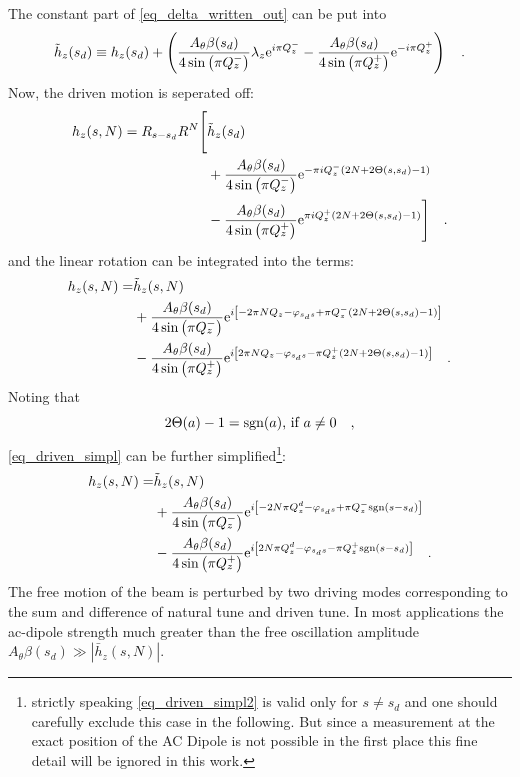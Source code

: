 %
The constant part of \eqref{eq_delta_written_out} can be put into 
%
\begin{equation}
    \tilde{h}_z(s_d) \equiv h_z(s_d) + 
    \left(
    \frac{A_\theta\beta(s_d)}{4\sin\left( \pi Q_z^-\right)}\lambda_z \text{e}^{i \pi Q_z^-}
    -\frac{A_\theta\beta(s_d)}{4\sin\left( \pi Q_z^+\right)} \text{e}^{-i\pi Q_z^+}
    \right)
    \quad .
\end{equation}
%
Now, the driven motion is seperated off:
%
\begin{align}
    h_z(s, N) = R_{s-s_d}R^N 
    \Bigg[&\tilde{h}_z(s_d) 
    \notag \\
        &+ \frac{A_\theta\beta(s_d)}{4\sin\left( \pi Q_z^-\right)} \text{e}^{-\pi i Q_z^-(2N+2\Theta(s,s_d)-1)} 
         \notag \\
        &- \frac{A_\theta\beta(s_d)}{4\sin\left( \pi Q_z^+\right)} \text{e}^{\pi i Q_z^+(2N+2\Theta(s,s_d) -1)}
    \Bigg]
    \quad .
    \label{eq_driven_simpl}
\end{align}
%
and the linear rotation can be integrated into the terms:
%
\begin{align}
    h_z(s, N) =
        &\tilde{h}_z(s, N) \notag \\
        &+\frac{A_\theta\beta(s_d)}{4\sin\left( \pi Q_z^-\right)}
        \text{e}^{i\left[-2\pi NQ_{z} - \varphi_{s_ds} + \pi Q_z^-(2N+2\Theta(s,s_d)-1)\right]}
        \notag\\
        &-\frac{A_\theta\beta(s_d)}{4\sin\left( \pi Q_z^+\right)}
        \text{e}^{i\left[2\pi NQ_{z} - \varphi_{s_ds}- \pi Q_z^+(2N + 2\Theta(s,s_d) -1)\right]}
    \quad .
    \label{eq_driven_simpl}
\end{align}
%
Noting that
%
\begin{equation}
  2\Theta(a) - 1 = \text{sgn}(a) \text{, if } a \neq 0
    \quad ,
\end{equation}
%
\eqref{eq_driven_simpl} can be further simplified\footnote{
    strictly speaking \eqref{eq_driven_simpl2} is valid only for $s\neq s_d$ and one should carefully exclude this case
    in the following. But since a measurement at the exact position of the AC Dipole is not possible in the first place
    this fine detail will be ignored in this work.
    }:
%
\begin{align}
    h_z(s, N) =
        &\tilde{h}_z(s, N) \notag \\
        &+ \frac{A_\theta\beta(s_d)}{4\sin\left( \pi Q_z^-\right)}
        \text{e}^{i\left[-2N\pi Q^{d}_{z} - \varphi_{s_ds} + \pi Q_z^-\text{sgn}(s-s_d)\right]} 
        \notag \\
        &- \frac{A_\theta\beta(s_d)}{4\sin\left( \pi Q_z^+\right)}
        \text{e}^{i\left[2N\pi Q^{d}_{z} - \varphi_{s_ds} - \pi Q_z^+\text{sgn}(s-s_d)\right]} 
    \quad .
    \label{eq_driven_simpl2}
\end{align}
%
The free motion of the beam is perturbed by two driving modes corresponding to the sum and difference
of natural tune and driven tune. In most applications the ac-dipole strength much greater than the free 
oscillation amplitude $A_\theta\beta(s_d) \gg |\bar{h}_z(s,N)|$.


